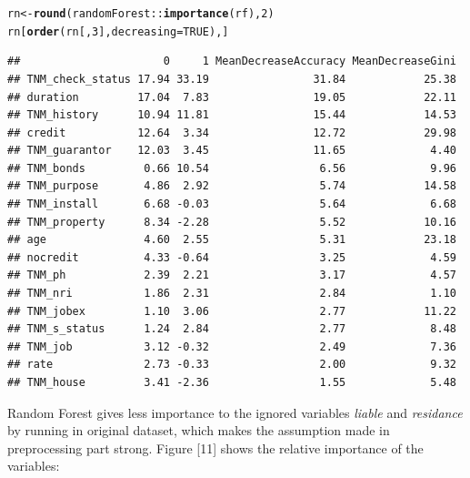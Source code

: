 \documentclass{article}\usepackage[]{graphicx}\usepackage[]{color}
\makeatletter
\newcommand{\hlnum}[1]{\textcolor[rgb]{0.686,0.059,0.569}{#1}}%
\newcommand{\hlopt}[1]{\textcolor[rgb]{0,0,0}{#1}}%
\newcommand{\hlstd}[1]{\textcolor[rgb]{0.345,0.345,0.345}{#1}}%
\newcommand{\hlkwb}[1]{\textcolor[rgb]{0.69,0.353,0.396}{#1}}%
\newcommand{\hlkwc}[1]{\textcolor[rgb]{0.333,0.667,0.333}{#1}}%
\newcommand{\hlkwd}[1]{\textcolor[rgb]{0.737,0.353,0.396}{\textbf{#1}}}%
\newenvironment{kframe}{%
 \def\at@end@of@kframe{}%
 \ifinner\ifhmode%
  \def\at@end@of@kframe{\end{minipage}}%
  \begin{minipage}{\columnwidth}%
 \fi\fi%
 \def\FrameCommand##1{\hskip\@totalleftmargin \hskip-\fboxsep
 \colorbox{shadecolor}{##1}\hskip-\fboxsep
     \hskip-\linewidth \hskip-\@totalleftmargin \hskip\columnwidth}%
 \MakeFramed {\advance\hsize-\width
   \@totalleftmargin\z@ \linewidth\hsize
   \@setminipage}}%
 {\par\unskip\endMakeFramed%
 \at@end@of@kframe}
\newenvironment{knitrout}{}{} %
\makeatother
\begin{document}
\begin{knitrout}
\color{fgcolor}\begin{kframe}
\begin{alltt}
\hlstd{rn} \hlkwb{<-} \hlkwd{round}\hlstd{(randomForest}\hlopt{::}\hlkwd{importance}\hlstd{(rf),} \hlnum{2}\hlstd{)}
\hlstd{rn[}\hlkwd{order}\hlstd{(rn[,}\hlnum{3}\hlstd{],} \hlkwc{decreasing}\hlstd{=}\hlnum{TRUE}\hlstd{),]}
\end{alltt}
\begin{verbatim}
##                      0     1 MeanDecreaseAccuracy MeanDecreaseGini
## TNM_check_status 17.94 33.19                31.84            25.38
## duration         17.04  7.83                19.05            22.11
## TNM_history      10.94 11.81                15.44            14.53
## credit           12.64  3.34                12.72            29.98
## TNM_guarantor    12.03  3.45                11.65             4.40
## TNM_bonds         0.66 10.54                 6.56             9.96
## TNM_purpose       4.86  2.92                 5.74            14.58
## TNM_install       6.68 -0.03                 5.64             6.68
## TNM_property      8.34 -2.28                 5.52            10.16
## age               4.60  2.55                 5.31            23.18
## nocredit          4.33 -0.64                 3.25             4.59
## TNM_ph            2.39  2.21                 3.17             4.57
## TNM_nri           1.86  2.31                 2.84             1.10
## TNM_jobex         1.10  3.06                 2.77            11.22
## TNM_s_status      1.24  2.84                 2.77             8.48
## TNM_job           3.12 -0.32                 2.49             7.36
## rate              2.73 -0.33                 2.00             9.32
## TNM_house         3.41 -2.36                 1.55             5.48
\end{verbatim}
\end{kframe}
\end{knitrout}
Random Forest gives less importance to the ignored variables \textit{liable} and \textit{residance} by running in original dataset, which makes the assumption made in preprocessing part strong. Figure [11] shows the relative importance of the variables:
\end{document}
